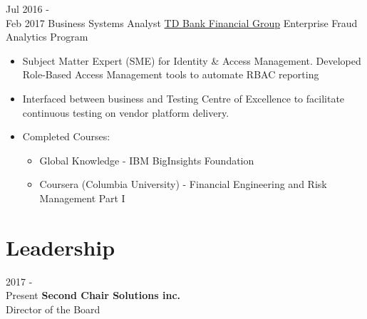 \documentclass[letterpaper]{twentysecondcv} %
\begin{document}
\begin{twenty}
    \twentyitem
   		{Jul 2016 - \\
   		Feb 2017}
        {Business Systems Analyst}
        {\href{http://www.td.com/}{TD Bank Financial Group}}
        {Enterprise Fraud Analytics Program}
        {
	        \item{}
    	    \item{}
        	\item{}
        	\item
        	\item
        	\item{}
        	\item{}
        }
        {
        {
        \begin{itemize}
	        \item Subject Matter Expert (SME) for Identity \& Access Management. Developed Role-Based Access Management tools to automate RBAC reporting
    	    \item Interfaced between business and Testing Centre of Excellence to facilitate continuous testing on vendor platform delivery.
        	\item Completed Courses: 
        	\begin{itemize}
        		\item Global Knowledge - IBM BigInsights Foundation
    	    	\item Coursera (Columbia University) - Financial Engineering and Risk Management Part I
	        \end{itemize}
	    \end{itemize}}
        }     
        
        
\end{twenty}

\section{Leadership}
\begin{twentyshort}
\twentyitemshort
		{2017 - \\ Present}
		{\textbf{Second Chair Solutions inc.} \\ Director of the Board}
%
\end{twentyshort}
\end{document}
